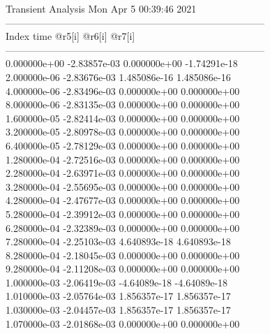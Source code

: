                                   Transient Analysis  Mon Apr  5 00:39:46  2021\\ \hline
--------------------------------------------------------------------------------\\ \hline
Index   time            @r5[i]          @r6[i]          @r7[i]          \\ \hline
--------------------------------------------------------------------------------\\ 	0.000000e+00	-2.83857e-03	0.000000e+00	-1.74291e-18	\\ 	2.000000e-06	-2.83676e-03	1.485086e-16	1.485086e-16	\\ 	4.000000e-06	-2.83496e-03	0.000000e+00	0.000000e+00	\\ 	8.000000e-06	-2.83135e-03	0.000000e+00	0.000000e+00	\\ 	1.600000e-05	-2.82414e-03	0.000000e+00	0.000000e+00	\\ 	3.200000e-05	-2.80978e-03	0.000000e+00	0.000000e+00	\\ 	6.400000e-05	-2.78129e-03	0.000000e+00	0.000000e+00	\\ 	1.280000e-04	-2.72516e-03	0.000000e+00	0.000000e+00	\\ 	2.280000e-04	-2.63971e-03	0.000000e+00	0.000000e+00	\\ 	3.280000e-04	-2.55695e-03	0.000000e+00	0.000000e+00	\\ 	4.280000e-04	-2.47677e-03	0.000000e+00	0.000000e+00	\\ 	5.280000e-04	-2.39912e-03	0.000000e+00	0.000000e+00	\\ 	6.280000e-04	-2.32389e-03	0.000000e+00	0.000000e+00	\\ 	7.280000e-04	-2.25103e-03	4.640893e-18	4.640893e-18	\\ 	8.280000e-04	-2.18045e-03	0.000000e+00	0.000000e+00	\\ 	9.280000e-04	-2.11208e-03	0.000000e+00	0.000000e+00	\\ 	1.000000e-03	-2.06419e-03	-4.64089e-18	-4.64089e-18	\\ 	1.010000e-03	-2.05764e-03	1.856357e-17	1.856357e-17	\\ 	1.030000e-03	-2.04457e-03	1.856357e-17	1.856357e-17	\\ 	1.070000e-03	-2.01868e-03	0.000000e+00	0.000000e+00	\\ \hline
